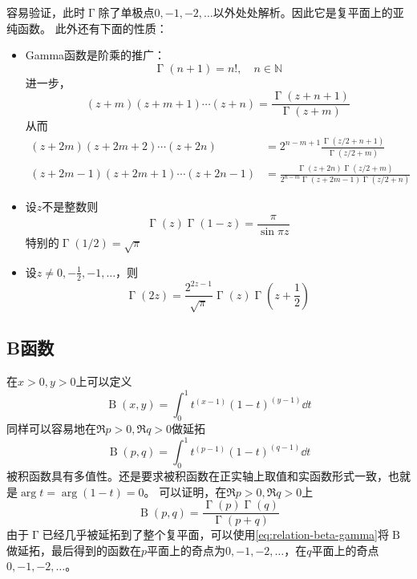 \documentclass[UTF8]{ctexart}
\newcommand*{\natnums}{\mathbb{N}}
\DeclareMathOperator{\gammafunc}{\Gamma}
\DeclareMathOperator{\betafunc}{B}
\begin{document}
容易验证，此时$\gammafunc$除了单极点$0, -1, -2, \ldots$以外处处解析。因此它是复平面上的亚纯函数。
此外还有下面的性质：
\begin{itemize}
    \item Gamma函数是阶乘的推广：
    \begin{equation}
        \gammafunc(n+1) = n!, \quad n \in \natnums
    \end{equation}
    进一步，
    \begin{equation}
        (z+m) (z+m+1) \cdots (z+n) = \frac{\gammafunc(z+n+1)}{\gammafunc(z+m)}
    \end{equation}
    从而
    \begin{equation}
        \begin{aligned}
            (z+2m)(z+2m+2) \cdots (z+2n) &= 2^{n-m+1} \frac{\gammafunc(z/2+n+1)}{\gammafunc(z/2+m)} \\
            (z+2m-1)(z+2m+1) \cdots (z+2n-1) &= \frac{\gammafunc(z+2n) \gammafunc(z/2 + m)}{2^{n-m} \gammafunc(z+2m-1) \gammafunc(z/2+n)}
        \end{aligned}
    \end{equation}
    \item 设$z$不是整数则
    \begin{equation}
        \gammafunc(z) \gammafunc(1-z) = \frac{\pi}{\sin \pi z}
    \end{equation}
    特别的$\gammafunc(1/2)=\sqrt{\pi}$
    \item 设$z \neq 0, -\frac{1}{2}, -1, \ldots$，则
    \begin{equation}
        \gammafunc(2z) = \frac{2^{2z-1}}{\sqrt{\pi}} \gammafunc(z) \gammafunc(z + \frac{1}{2})
    \end{equation}
\end{itemize}

\subsection{B函数}

在$x>0, y>0$上可以定义
\begin{equation}
    \betafunc(x, y) = \int_0^1 t^{(x-1)} (1-t)^{(y-1)} \dd t
\end{equation}
同样可以容易地在$\Re p>0, \Re q>0$做延拓
\begin{equation}
    \betafunc(p, q) = \int_0^1 t^{(p-1)} (1-t)^{(q-1)} \dd t
\end{equation}
被积函数具有多值性。还是要求被积函数在正实轴上取值和实函数形式一致，也就是$\arg t = \arg (1-t) = 0$。
可以证明，在$\Re p>0, \Re q>0$上
\begin{equation}
    \betafunc(p, q) = \frac{\gammafunc(p) \gammafunc(q)}{\gammafunc(p+q)}
    \label{eq:relation-beta-gamma}
\end{equation}
由于$\gammafunc$已经几乎被延拓到了整个复平面，可以使用\eqref{eq:relation-beta-gamma}将$\betafunc$做延拓，最后得到的函数在$p$平面上的奇点为$0, -1, -2, \ldots$，在$q$平面上的奇点$0, -1, -2, \ldots$。
\end{document}
